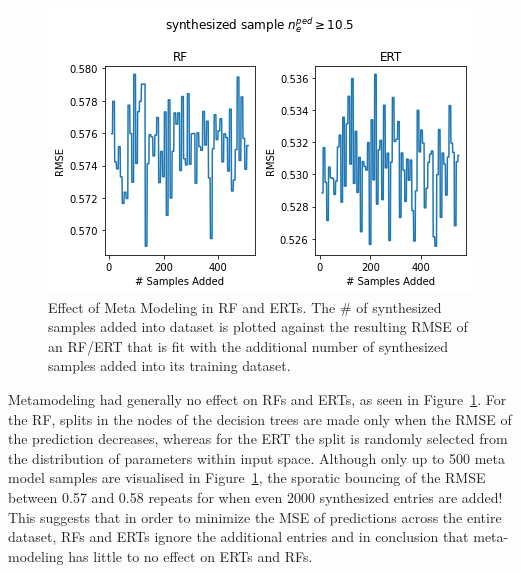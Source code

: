 \documentclass[a4paper, twoside, final, 12pt]{article}
\begin{document}
{\begin{figure}
		\centering
		\vspace{-30pt}
		\includegraphics[width=\linewidth, keepaspectratio=true, trim=0 0 0 30, clip]{./src/ERT_vs_RF_meta_modeling}
		\vspace{-22pt}
		\caption{Effect of Meta Modeling in RF and ERTs. The \# of synthesized samples added into dataset is plotted against the resulting RMSE of an RF/ERT that is fit with the additional number of synthesized samples added into its training dataset.}
		\label{fig:RF_meta_model}
\end{figure}
Metamodeling had generally no effect on RFs and ERTs, as seen in Figure~\ref{fig:RF_meta_model}.
For the RF, splits in the nodes of the decision trees are made only when the RMSE of the prediction decreases, whereas for the ERT the split is randomly selected from the distribution of parameters within input space.
Although only up to 500 meta model samples are visualised in Figure~\ref{fig:RF_meta_model}, the sporatic bouncing of the RMSE between 0.57 and 0.58 repeats for when even 2000 synthesized entries are added!
This suggests that in order to minimize the MSE of predictions across the entire dataset, RFs and ERTs ignore the additional entries and in  conclusion that meta-modeling has little to no effect on ERTs and RFs.

}
\end{document}

